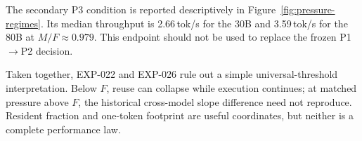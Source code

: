 The secondary P3 condition is reported descriptively in Figure~\ref{fig:pressure-regimes}. Its median throughput is 2.66\,tok/s for the 30B and 3.59\,tok/s for the 80B at $M/F\approx0.979$. This endpoint should not be used to replace the frozen P1$\rightarrow$P2 decision.

Taken together, EXP-022 and EXP-026 rule out a simple universal-threshold interpretation. Below $F$, reuse can collapse while execution continues; at matched pressure above $F$, the historical cross-model slope difference need not reproduce. Resident fraction and one-token footprint are useful coordinates, but neither is a complete performance law.
